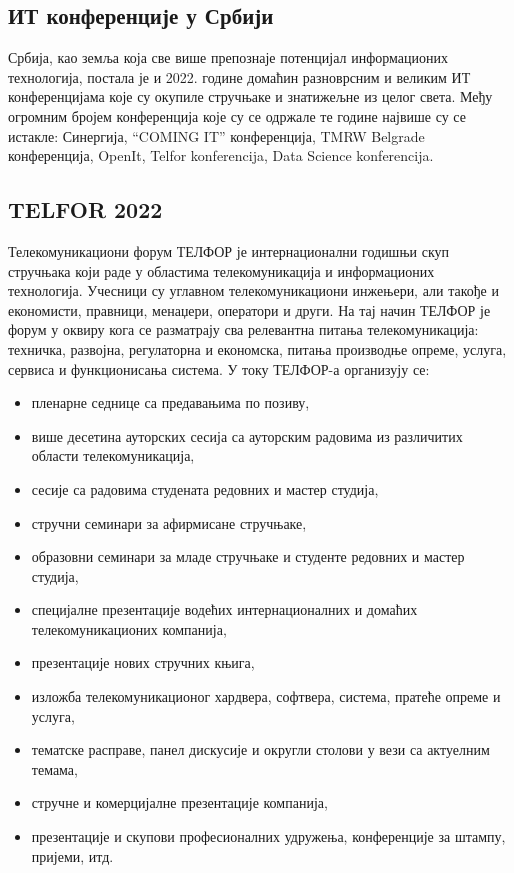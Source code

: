 \documentclass[12pt]{article}
\begin{document}
\subsection{ИТ конференције у Србији}
Србија, као земља која све више препознаје потенцијал информационих технологија, постала је и 2022. године домаћин разноврсним и великим ИТ конференцијама које су окупиле стручњаке и знатижељне из целог света. Међу огромним бројем конференција које су се одржале те године највише су се истакле: Синергија, “COMING IT” конференција, TMRW Belgrade конференција, OpenIt, Telfor konferencija, Data Science konferencija.

\subsection{TELFOR 2022}
Телекомуникациони форум ТЕЛФОР је интернационални годишњи скуп стручњака који раде у областима телекомуникација и информационих технологија. Учесници су углавном телекомуникациони инжењери, али такође и економисти, правници, менаџери, оператори и други. На тај начин ТЕЛФОР је форум у оквиру кога се разматрају сва релевантна питања телекомуникација: техничка, развојна, регулаторна и економска, питања производње опреме, услуга, сервиса и функционисања система.
У току ТЕЛФОР-а организују се:
\begin{itemize}
	\item пленарне седнице са предавањима по позиву,
	\item више десетина ауторских сесија са ауторским радовима из различитих области телекомуникација,
	\item сесије са радовима студената редовних и мастер студија,
	\item стручни семинари за афирмисане стручњаке,
	\item образовни семинари за младе стручњаке и студенте редовних и мастер студија,
	\item специјалне презентације водећих интернационалних и домаћих телекомуникационих компанија,
	\item презентације нових стручних књига,
	\item изложба телекомуникационог хардвера, софтвера, система, пратеће опреме и услуга,
	\item тематске расправе, панел дискусије и округли столови у вези са актуелним темама,
	\item стручне и комерцијалне презентације компанија,
	\item презентације и скупови професионалних удружења, конференције за штампу, пријеми, итд.
\end{itemize}
\end{document}
